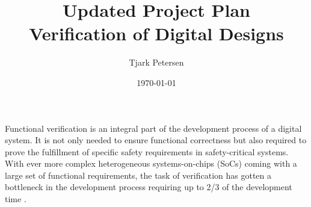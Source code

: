 \documentclass[11pt]{article}
\begin{document}
\title{{\Huge Updated Project Plan}\\ Verification of Digital Designs}
\author{Tjark Petersen}
\date{\today}

\maketitle

Functional verification is an integral part of the development process of a digital system. It is not only needed to ensure functional correctness but also required to prove the fulfillment of specific safety requirements in safety-critical systems. 
With ever more complex heterogeneous systems-on-chips (SoCs) coming with a large set of functional requirements, the task of verification has gotten a bottleneck in the development process requiring up to 2/3 of the development time \cite{bergeron2012writing}.
\end{document}
